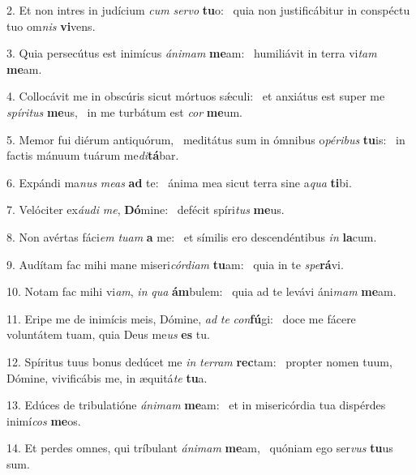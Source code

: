 2. Et non intres in judícium \textit{cum} \textit{ser}\textit{vo} \textbf{tu}o: \ast\  quia non justificábitur in conspéctu tuo om\textit{nis} \textbf{vi}vens.\

3. Quia persecútus est inimícus \textit{á}\textit{ni}\textit{mam} \textbf{me}am: \ast\  humiliávit in terra vi\textit{tam} \textbf{me}am.\

4. Collocávit me in obscúris sicut mórtuos sǽculi: \dag\  et anxiátus est super me \textit{spí}\textit{ri}\textit{tus} \textbf{me}us, \ast\  in me turbátum est \textit{cor} \textbf{me}um.\

5. Memor fui diérum antiquórum, \dag\  meditátus sum in ómnibus o\textit{pé}\textit{ri}\textit{bus} \textbf{tu}is: \ast\  in factis mánuum tuárum me\textit{di}\textbf{tá}bar.\

6. Expándi ma\textit{nus} \textit{me}\textit{as} \textbf{ad} te: \ast\  ánima mea sicut terra sine a\textit{qua} \textbf{ti}bi.\

7. Velóciter ex\textit{áu}\textit{di} \textit{me}, \textbf{Dó}mine: \ast\  defécit spíri\textit{tus} \textbf{me}us.\

8. Non avértas fáci\textit{em} \textit{tu}\textit{am} \textbf{a} me: \ast\  et símilis ero descendéntibus \textit{in} \textbf{la}cum.\

9. Audítam fac mihi mane miseri\textit{cór}\textit{di}\textit{am} \textbf{tu}am: \ast\  quia in te \textit{spe}\textbf{rá}vi.\

10. Notam fac mihi vi\textit{am}, \textit{in} \textit{qua} \textbf{ám}bulem: \ast\  quia ad te levávi áni\textit{mam} \textbf{me}am.\

11. Eripe me de inimícis meis, Dómine, \textit{ad} \textit{te} \textit{con}\textbf{fú}gi: \ast\  doce me fácere voluntátem tuam, quia Deus me\textit{us} \textbf{es} tu.\

12. Spíritus tuus bonus dedúcet me \textit{in} \textit{ter}\textit{ram} \textbf{rec}tam: \ast\  propter nomen tuum, Dómine, vivificábis me, in æquitá\textit{te} \textbf{tu}a.\

13. Edúces de tribulatióne \textit{á}\textit{ni}\textit{mam} \textbf{me}am: \ast\  et in misericórdia tua dispérdes inimí\textit{cos} \textbf{me}os.\

14. Et perdes omnes, qui tríbulant \textit{á}\textit{ni}\textit{mam} \textbf{me}am, \ast\  quóniam ego ser\textit{vus} \textbf{tu}us sum.\

